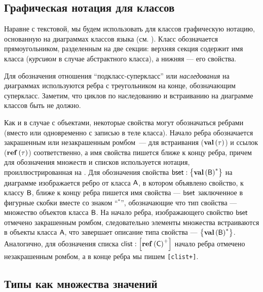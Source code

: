 \subsection{Графическая нотация для классов}

Наравне с текстовой, мы будем использовать для классов графическую нотацию, основанную на диаграммах классов языка  (см. ). Класс обозначается прямоугольником, разделенным на две секции: верхняя секция содержит имя класса (\emph{курсивом} в случае абстрактного класса), а нижняя --- его свойства.


Для обозначения отношения ``подкласс-суперкласс'' или \emph{наследования} на диаграммах используются ребра с треугольником на конце, обозначающим суперкласс. Заметим, что циклов по наследованию и встраиванию на диаграмме классов быть не должно.

Как и в случае с объектами, некоторые свойства могут обозначаться ребрами (вместо или одновременно с записью в теле класса). Начало ребра обозначается закрашенным или незакрашенным ромбом~--- для встраивания ($\mathbf{val}\left(\tau\right)$) и ссылок ($\mathbf{ref}\left(\tau\right)$) соответственно, а имя свойства пишется ближе к концу ребра, причем для обозначения множеств и списков используется нотация, проиллюстрированная на .
%
% 
Для обозначения свойства $\mathsf{bset} : \left\{\mathbf{val}\left(\mathsf{B}\right)^*\right\}$ на диаграмме изображается ребро от класса $\mathsf{A}$, в котором объявлено свойство, к классу $\mathsf{B}$, ближе к концу ребра пишется имя свойства --- $\mathsf{bset}$ заключенное в фигурные скобки вместе со знаком ``$^*$'', обозначающие что тип свойства --- множество объектов класса $\mathsf{B}$. На  начало ребра, изображающего свойство $\mathsf{bset}$ отмечено закрашенным ромбом, следовательно элементы множества встраиваются в объекты класса $\mathsf{A}$, что завершает описание типа свойства --- $\left\{\mathbf{val}\left(\mathsf{B}\right)^*\right\}$. Аналогично, для обозначения списка $\mathsf{clist} : \left[\mathbf{ref}\left(\mathsf{C}\right)^+\right]$ начало ребра отмечено незакрашенным ромбом, а в конце ребра мы пишем \texttt{\small[clist+]}.

\subsection{Типы как множества значений}

